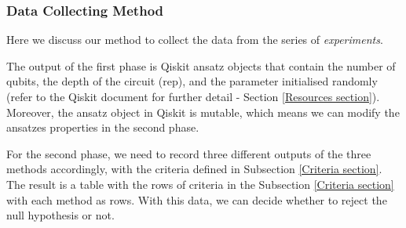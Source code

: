 
\subsubsection{Data Collecting Method}
\label{Data Collecting Section}
Here we discuss our method to collect the data from the series of \emph{experiments}.

The output of the first phase is Qiskit ansatz objects that contain the number of qubits, the depth of the circuit (rep), and the parameter initialised randomly (refer to the Qiskit document for further detail - Section \ref{Resources section}).
Moreover, the ansatz object in Qiskit is mutable, which means we can modify the ansatzes properties in the second phase.

For the second phase, we need to record three different outputs of the three methods accordingly,
with the criteria defined in Subsection \ref{Criteria section}.
The result is a table with the rows of criteria in the Subsection \ref{Criteria section} with each method as rows.
With this data, we can decide whether to reject the null hypothesis or not.

